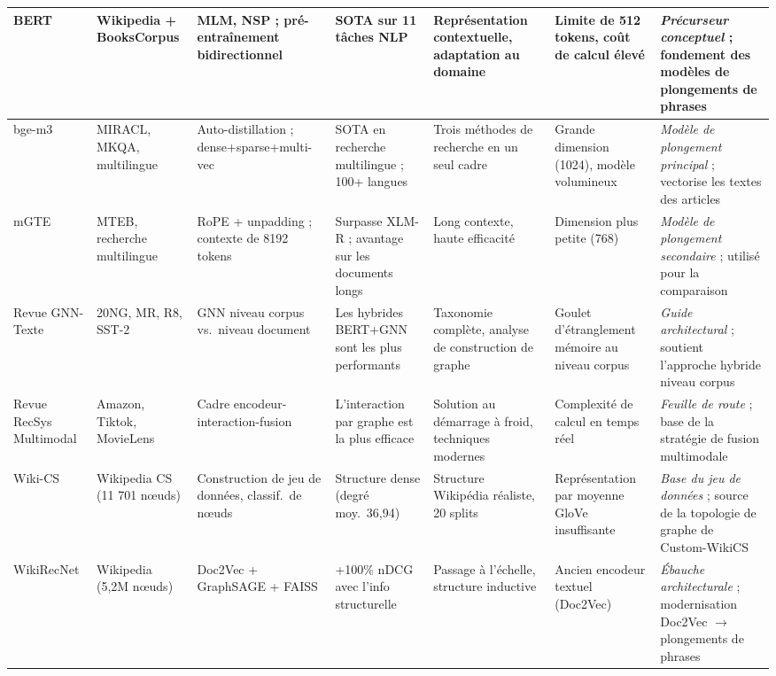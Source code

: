 \begin{landscape}
\begin{longtable}{|p{2.0cm}|p{2.0cm}|p{2.8cm}|p{3.5cm}|p{3.0cm}|p{3.0cm}|p{3.8cm}|}
BERT \cite{devlin2019bert} &
Wikipedia + BooksCorpus &
MLM, NSP ; pré-entraînement bidirectionnel &
SOTA sur 11 tâches NLP &
Représentation contextuelle, adaptation au domaine &
Limite de 512 tokens, coût de calcul élevé &
\textit{Précurseur conceptuel} ; fondement des modèles de plongements de phrases \\
\hline

bge-m3 \cite{chen2025bgem3} &
MIRACL, MKQA, multilingue &
Auto-distillation ; dense+sparse+multi-vec &
SOTA en recherche multilingue ; 100+ langues &
Trois méthodes de recherche en un seul cadre &
Grande dimension (1024), modèle volumineux &
\textit{Modèle de plongement principal} ; vectorise les textes des articles \\
\hline

mGTE \cite{zhang2024mgte} &
MTEB, recherche multilingue &
RoPE + unpadding ; contexte de 8192 tokens &
Surpasse XLM-R ; avantage sur les documents longs &
Long contexte, haute efficacité &
Dimension plus petite (768) &
\textit{Modèle de plongement secondaire} ; utilisé pour la comparaison \\
\hline

Revue GNN-Texte \cite{li2022graph} &
20NG, MR, R8, SST-2 &
GNN niveau corpus vs.\ niveau document &
Les hybrides BERT+GNN sont les plus performants &
Taxonomie complète, analyse de construction de graphe &
Goulet d'étranglement mémoire au niveau corpus &
\textit{Guide architectural} ; soutient l'approche hybride niveau corpus \\
\hline

Revue RecSys Multimodal \cite{zhou2023multimodal} &
Amazon, Tiktok, MovieLens &
Cadre encodeur-interaction-fusion &
L'interaction par graphe est la plus efficace &
Solution au démarrage à froid, techniques modernes &
Complexité de calcul en temps réel &
\textit{Feuille de route} ; base de la stratégie de fusion multimodale \\
\hline

Wiki-CS \cite{mernyei2020wikics} &
Wikipedia CS (11 701 n\oe uds) &
Construction de jeu de données, classif.\ de n\oe uds &
Structure dense (degré moy.\ 36,94) &
Structure Wikipédia réaliste, 20 splits &
Représentation par moyenne GloVe insuffisante &
\textit{Base du jeu de données} ; source de la topologie de graphe de Custom-WikiCS \\
\hline

WikiRecNet \cite{wikirecnet2020} &
Wikipedia (5,2M n\oe uds) &
Doc2Vec + GraphSAGE + FAISS &
+100\% nDCG avec l'info structurelle &
Passage à l'échelle, structure inductive &
Ancien encodeur textuel (Doc2Vec) &
\textit{Ébauche architecturale} ; modernisation Doc2Vec $\to$ plongements de phrases \\
\hline


\end{longtable}
\end{landscape}
